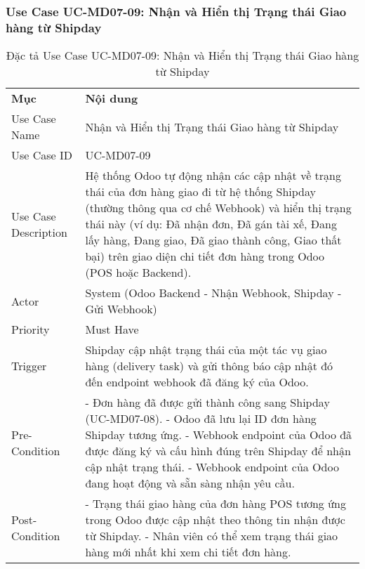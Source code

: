 \subsubsection{Use Case UC-MD07-09: Nhận và Hiển thị Trạng thái Giao hàng từ Shipday}

\begin{longtable}{|m{4cm}|p{11cm}|}
\caption{Đặc tả Use Case UC-MD07-09: Nhận và Hiển thị Trạng thái Giao hàng từ Shipday} \label{tab:uc_md07_09} \\
\hline

\endhead %
\hline
\endfoot %
\hline
\endlastfoot %
\multicolumn{2}{|c|}{\textbf{2.1. Tóm tắt (Summary)}} \\
\hline
\textbf{Mục} & \textbf{Nội dung} \\
\hline
Use Case Name & Nhận và Hiển thị Trạng thái Giao hàng từ Shipday \\
\hline
Use Case ID & UC-MD07-09 \\
\hline
Use Case Description & Hệ thống Odoo tự động nhận các cập nhật về trạng thái của đơn hàng giao đi từ hệ thống Shipday (thường thông qua cơ chế Webhook) và hiển thị trạng thái này (ví dụ: Đã nhận đơn, Đã gán tài xế, Đang lấy hàng, Đang giao, Đã giao thành công, Giao thất bại) trên giao diện chi tiết đơn hàng trong Odoo (POS hoặc Backend). \\
\hline
Actor & System (Odoo Backend - Nhận Webhook, Shipday - Gửi Webhook) \\
\hline
Priority & Must Have \\
\hline
Trigger & Shipday cập nhật trạng thái của một tác vụ giao hàng (delivery task) và gửi thông báo cập nhật đó đến endpoint webhook đã đăng ký của Odoo. \\
\hline
Pre-Condition & - Đơn hàng đã được gửi thành công sang Shipday (UC-MD07-08). \newline - Odoo đã lưu lại ID đơn hàng Shipday tương ứng. \newline - Webhook endpoint của Odoo đã được đăng ký và cấu hình đúng trên Shipday để nhận cập nhật trạng thái. \newline - Webhook endpoint của Odoo đang hoạt động và sẵn sàng nhận yêu cầu. \\
\hline
Post-Condition & - Trạng thái giao hàng của đơn hàng POS tương ứng trong Odoo được cập nhật theo thông tin nhận được từ Shipday. \newline - Nhân viên có thể xem trạng thái giao hàng mới nhất khi xem chi tiết đơn hàng. \\

\end{longtable}
